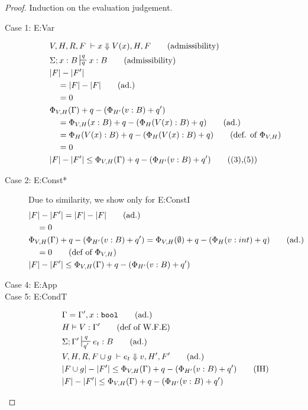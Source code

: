 \documentclass[11pt]{article}
\newcommand{\irl}[1]{\mathtt{#1}}
\begin{document}
\begin{proof}
Induction on the evaluation judgement.\\
\begin{description}
  \item[Case 1: E:Var]
  \begin{align}
  &V,H,R,F \; \vdash x \Downarrow V(x),H,F \tag{admissibility}\\
  &\Sigma; x : B \sststile{q}{q} x : B \tag{admissibility}\\
  &|F| - |F'|\\
  &\quad = |F| - |F| \tag{ad.}\\
  &\quad = 0\\
  &\Phi_{V,H}(\Gamma) + q - (\Phi_{H'}(v:B) + q')\\
  &\quad = \Phi_{V,H}(x : B) + q - (\Phi_{H}(V(x) : B) + q) \tag{ad.}\\
  &\quad = \Phi_{H}(V(x) : B) + q  - (\Phi_{H}(V(x) : B) + q) \tag{def. of $\Phi_{V,H}$}\\
  &\quad = 0\\
  &|F| - |F'| \le \Phi_{V,H}(\Gamma) +q - (\Phi_{H'}(v:B) + q') \tag{(3),(5)}
  \end{align}
  \item[Case 2: E:Const*]
  Due to similarity, we show only for E:ConstI
  \begin{align*}
  &|F| - |F'| = |F| - |F| \tag{ad.}\\
  &\quad = 0\\
  &\Phi_{V,H}(\Gamma) +q - (\Phi_{H'}(v:B) + q') = \Phi_{V,H}(\emptyset) +q - (\Phi_{H}(v:int) + q) \tag{ad.}\\
  &\quad = 0 \tag{def of $\Phi_{V,H}$}\\
  &|F| - |F'| \le \Phi_{V,H}(\Gamma) +q - (\Phi_{H'}(v:B) + q')
  \end{align*}
  \item[Case 4: E:App]
  \item[Case 5: E:CondT]
  \begin{align*}
  &\Gamma = \Gamma', x : \irl{bool} \tag{ad.}\\
  &H \vDash V : \Gamma' \tag{def of W.F.E}\\
  &\Sigma; \Gamma' \sststile{q'}{q} e_t : B \tag{ad.}\\
  &V,H,R,F \cup g\; \vdash e_t \Downarrow v, H',F' \tag{ad.}\\
  &|F \cup g| - |F'| \le \Phi_{V,H}(\Gamma) +q - (\Phi_{H'}(v:B) + q') \tag{IH}\\
  &|F| - |F'| \le \Phi_{V,H}(\Gamma) +q - (\Phi_{H'}(v:B) + q') \\

\end{align*}
\end{description}
\end{proof}
\end{document}
